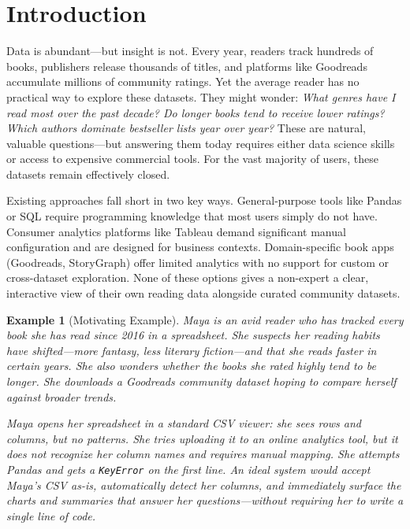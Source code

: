 \documentclass[sigconf]{acmart}
\newtheorem{example}{Example}
\begin{document}
\section{Introduction}

Data is abundant---but insight is not. Every year, readers track hundreds of books, publishers release thousands of titles, and platforms like Goodreads accumulate millions of community ratings. Yet the average reader has no practical way to explore these datasets. They might wonder: \textit{What genres have I read most over the past decade? Do longer books tend to receive lower ratings? Which authors dominate bestseller lists year over year?} These are natural, valuable questions---but answering them today requires either data science skills or access to expensive commercial tools. For the vast majority of users, these datasets remain effectively closed.

Existing approaches fall short in two key ways. General-purpose tools like Pandas or SQL require programming knowledge that most users simply do not have. Consumer analytics platforms like Tableau demand significant manual configuration and are designed for business contexts. Domain-specific book apps (Goodreads, StoryGraph) offer limited analytics with no support for custom or cross-dataset exploration. None of these options gives a non-expert a clear, interactive view of their own reading data alongside curated community datasets.

\begin{example}[Motivating Example]

    Maya is an avid reader who has tracked every book she has read since 2016 in a spreadsheet. She suspects her reading habits have shifted---more fantasy, less literary fiction---and that she reads faster in certain years. She also wonders whether the books she rated highly tend to be longer. She downloads a Goodreads community dataset hoping to compare herself against broader trends.

    Maya opens her spreadsheet in a standard CSV viewer: she sees rows and columns, but no patterns. She tries uploading it to an online analytics tool, but it does not recognize her column names and requires manual mapping. She attempts Pandas and gets a \texttt{KeyError} on the first line. An ideal system would accept Maya's CSV as-is, automatically detect her columns, and immediately surface the charts and summaries that answer her questions---without requiring her to write a single line of code.

\end{example}
\end{document}
